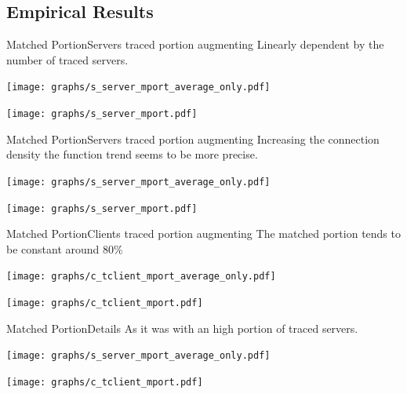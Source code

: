 \subsection{Empirical Results}
	\begin{frame}{Matched Portion}{Servers traced portion augmenting}
			\small Linearly dependent by the number of traced servers.
			\begin{minipage}{.5\textwidth}
				\texttt{[image: graphs/s\_server\_mport\_average\_only.pdf]}
			\end{minipage}
			\begin{minipage}{.4\textwidth}
				\texttt{[image: graphs/s\_server\_mport.pdf]}
			\end{minipage}
	\end{frame}
	\begin{frame}{Matched Portion}{Servers traced portion augmenting}
			\small Increasing the connection density the function trend seems to be more
			precise.
			\begin{minipage}{.5\textwidth}
				\texttt{[image: graphs/s\_server\_mport\_average\_only.pdf]}
			\end{minipage}
			\begin{minipage}{.4\textwidth}
				\texttt{[image: graphs/s\_server\_mport.pdf]}
			\end{minipage}
	\end{frame}
	\begin{frame}{Matched Portion}{Clients traced portion augmenting}
			\small The matched portion tends to be constant around 80\%
			\begin{minipage}{.5\textwidth}
				\texttt{[image: graphs/c\_tclient\_mport\_average\_only.pdf]}
			\end{minipage}
			\begin{minipage}{.4\textwidth}
				\texttt{[image: graphs/c\_tclient\_mport.pdf]}
			\end{minipage}
	\end{frame}
	\begin{frame}{Matched Portion}{Details}
			\small As it was with an high portion of traced servers.
			\begin{minipage}{.5\textwidth}
				\texttt{[image: graphs/s\_server\_mport\_average\_only.pdf]}
			\end{minipage}
			\begin{minipage}{.4\textwidth}
				\texttt{[image: graphs/c\_tclient\_mport.pdf]}
			\end{minipage}
	\end{frame}
